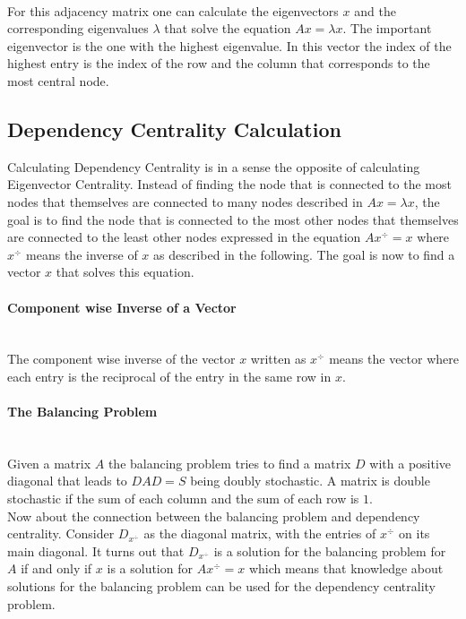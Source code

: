 \mbox{} \\
For this adjacency matrix one can calculate the eigenvectors $x$ and the corresponding 
eigenvalues $ \lambda $ that solve the equation $Ax = \lambda x$. The important eigenvector is the one 
with the highest eigenvalue. In this vector the index of the highest entry is the 
index of the row and the column that corresponds to the most central node.




\subsection{Dependency Centrality Calculation}

Calculating Dependency Centrality is in a sense the opposite of calculating Eigenvector Centrality.
Instead of finding the node that is connected to the most nodes that themselves are connected to many
nodes described in $Ax = \lambda x$, the goal is to find the node that is connected to the most other
nodes that themselves are connected to the least other nodes expressed in the equation $Ax^\div=x$
where $x^\div$ means the inverse of $x$ as described in the following. The goal is now to find a
vector $x$ that solves this equation.

\paragraph{Component wise Inverse of a Vector} \mbox{} \medskip \\
The component wise inverse of the vector $x$ written as $x^\div$ means the vector where each entry is the reciprocal
of the entry in the same row in $x$.

\paragraph{The Balancing Problem} \mbox{} \medskip \\
Given a matrix $A$ the balancing problem tries to find a matrix $D$ with a positive diagonal that
leads to $DAD=S$ being doubly stochastic. A matrix is double stochastic if the sum of each column
and the sum of each row is $1$. \\
Now about the connection between the balancing problem and dependency centrality.
Consider $D_{x^\div}$ as the diagonal matrix, with the entries of $x^\div$ on its main diagonal.
It turns out that $D_{x^\div}$ is a solution for the balancing problem for $A$ if and only if $x$
is a solution for $Ax^\div=x$ \parencite{2016-bozzo-a} which means that knowledge about solutions for 
the balancing problem can be used for the dependency centrality problem.

